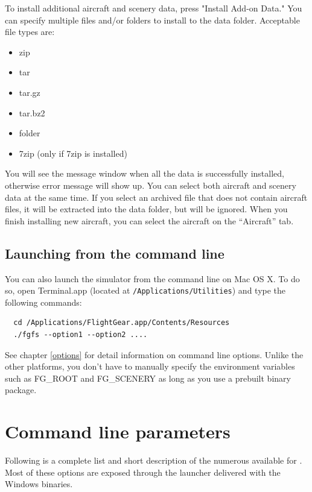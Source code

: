 To install additional aircraft and scenery data, press "Install Add-on Data." You can specify multiple files and/or folders to install to the \FlightGear{} data folder. Acceptable file types are:
\begin{itemize}
\item zip
\item tar
\item tar.gz
\item tar.bz2
\item folder
\item 7zip (only if 7zip is installed)
\end{itemize}

You will see the message window when all the data is successfully installed, otherwise error message will show up. You can select both aircraft and scenery data at the same time. If you select an archived file that does not contain aircraft files, it will be extracted into the data folder, but will be ignored. When you finish installing new aircraft, you can select the aircraft on the ``Aircraft'' tab.

\subsection{Launching from the command line}
You can also launch the simulator from the command line on Mac OS X. To do so, open Terminal.app (located at \texttt{/Applications/Utilities}) and type the following commands:
\begin{verbatim}
  cd /Applications/FlightGear.app/Contents/Resources
  ./fgfs --option1 --option2 ....
\end{verbatim}

See chapter \ref{options} for detail information on command line options. Unlike the other platforms, you don't have to manually specify the environment variables such as FG\_ROOT and FG\_SCENERY as long as you use a prebuilt binary package.

\section{Command line parameters\label{options}}
Following is a complete list and short description of the numerous 
available for \FlightGear{}. Most of these options are exposed through the \FlightGear{} launcher delivered with the
Windows binaries.

